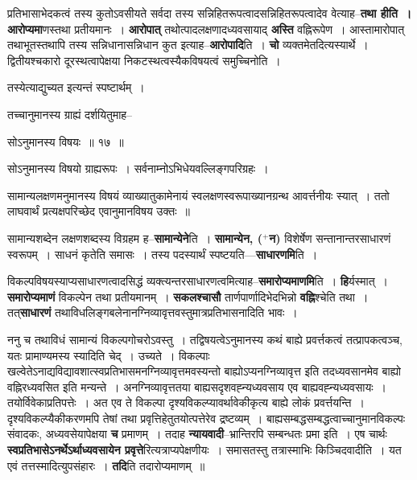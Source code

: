 \documentclass[article,12pt,a4paper]{memoir}
\newcommand{\add}[1]{($^{+}$#1)}
\begin{document}
	  \pstart प्रतिभासाभेदकत्वं तस्य कुतोऽवसीयते सर्वदा तस्य सन्निहितरूपत्वादसन्निहितरूपत्वादेव वेत्याह--\textbf{तथा हीति । आरोप्यमा}णस्तथा प्रतीयमानः । \textbf{आरोपात्} तथोत्पादलक्षणादध्यवसायाद् \textbf{अस्ति} वह्निरूपेण । आस्तामारोपात् तथाभूतस्तथापि तस्य सन्निधानासन्निधान कुत इत्याह--\textbf{आरोपादि}ति । \textbf{चो} व्यक्तमेतदित्यस्यार्थे । द्वितीयश्चकारो दूरस्थत्वापेक्षया निकटस्थत्वस्यैकविषयत्वं समुच्चिनोति ।
	\pend
      

	  \pstart तस्येत्याद्युच्यत इत्यन्तं स्पष्टार्थम् ।
	\pend
	  \bigskip
	  \begingroup
	

	  \pstart तच्चानुमानस्य ग्राह्यं दर्शयितुमाह--
	\pend
        
	  \bigskip
	  \begingroup
	

	  \pstart सोऽनुमानस्य विषयः ॥ १७ ॥
	\pend
      
	  \endgroup
	 

	  \pstart सोऽनुमानस्य विषयो ग्राह्यरूपः । सर्वनाम्नोऽभिधेयवल्लिङ्गपरिग्रहः ।
	\pend
        

	  \pstart सामान्यलक्षणमनुमानस्य विषयं व्याख्यातुकामेनायं स्वलक्षणस्वरूपाख्यानग्रन्थ आवर्त्तनीयः स्यात् । ततो लाघवार्थं प्रत्यक्षपरिच्छेद एवानुमानविषय उक्तः ॥
	\pend
      
	  \endgroup
	

	  \pstart सामान्यशब्देन लक्षणशब्दस्य विग्रहम ह--\textbf{सामान्येने}ति । \textbf{सामान्येन, \add{न}} विशेर्षेण सन्तानान्तरसाधारणं स्वरूपम् । साधनं कृतेति समासः । तस्य पदस्यार्थं स्पष्टयति—\textbf{साधारणमि}ति ।
	\pend
      

	  \pstart विकल्पविषयस्याप्यसाधारणत्वादसिद्धं व्यक्त्यन्तरसाधारणत्वमित्याह--\textbf{समारोप्यमाणमि}ति । \textbf{हि}र्यस्मात् । \textbf{समारोप्यमाणं} विकल्पेन तथा प्रतीयमानम् । \textbf{सकलश्चासौ} तार्णपार्णादिभेदभिन्नो \textbf{वह्नि}श्चेति तथा । तत्\textbf{साधारणं} तथाविधलिङ्गबलेनानग्निव्यावृत्तवस्तुमात्रप्रतिभासनादिति भावः ।
	\pend
      

	  \pstart ननु च तथाविधं सामान्यं विकल्पगोचरोऽवस्तु । तद्विषयत्वेऽनुमानस्य कथं बाह्ये प्रवर्त्तकत्वं तत्प्रापकत्वञ्च, यतः प्रामाण्यमस्य स्यादिति चेद् । उच्यते । विकल्पाः खल्वेतेऽनाद्यविद्यावशात्स्वप्रतिभासमनग्निव्यावृत्तमवस्यन्तो बाह्योऽप्यनग्निव्यावृत्त इति तदध्यवसानमेव बाह्यो वह्निरध्यवसित इति मन्यन्ते । अनग्निव्यावृत्ततया बाह्यसदृशवह्न्यध्यवसाय एव बाह्यवह्न्यध्यवसायः । तयोर्विवेकाप्रतिपत्तेः । अत एव ते विकल्पा दृश्यविकल्प्यावर्थावेकीकृत्य बाह्ये लोकं प्रवर्त्तयन्ति । दृश्यविकल्प्यैकीकरणमपि तेषां तथा प्रवृत्तिहेतुतयोत्पत्तेरेव द्रष्टव्यम् । \leavevmode{} बाह्यसम्बद्धसम्बद्धत्वाच्चानुमानविकल्पः संवादकः, अध्यवसेयापेक्षया \textbf{च} प्रमाणम् । तदाह \textbf{न्यायवादी}--भ्रान्तिरपि सम्बन्धतः प्रमा इति । एष चार्थः \textbf{स्वप्रतिभासेऽनर्थेऽर्थाध्यवसायेन प्रवृत्ते}रित्यत्राप्यपेक्षणीयः । समासतस्तु तत्रास्माभिः किञ्चिदवादीति । यत एवं तत्तस्मादित्युपसंहारः । \textbf{तदि}ति तदारोप्यमाणम् ॥
	\pend
      
\end{document}

